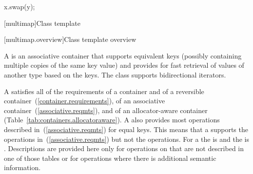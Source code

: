 \begin{itemdescr}
\pnum
\effects
\begin{codeblock}
x.swap(y);
\end{codeblock}
\end{itemdescr}

[multimap]{Class template }

[multimap.overview]{Class template  overview}

\pnum
{}%
A
is an associative container that supports equivalent keys (possibly containing multiple copies of
the same key value) and provides for fast retrieval of values of another type
based on the keys.
The
class
supports bidirectional iterators.

\pnum
A
 satisfies all of the requirements of a container and of a
reversible container~(\ref{container.requirements}), of an associative
container~(\ref{associative.reqmts}), and of an allocator-aware container
(Table~\ref{tab:containers.allocatoraware}).
A
also provides most operations described in~(\ref{associative.reqmts})
for equal keys.
This means that a
supports the
operations in~(\ref{associative.reqmts})
but not the
operations.
For a
the
is
and the
is
.
Descriptions are provided here only for operations on
that are not described in one of those tables
or for operations where there is additional semantic information.

